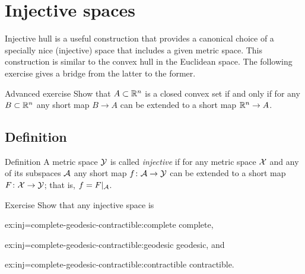\chapter{Injective spaces}\label{chap:injective}


Injective hull is a useful construction that provides a canonical choice of a specially nice (injective) space that includes a given metric space. 
This construction is similar to the convex hull in the Euclidean space.
The following exercise gives a bridge from the latter to the former.

\begin{thm}{Advanced exercise}\label{ex:conv-short}
Show that $A\subset \mathbb{R}^n$ is a closed convex set if and only if for any  $B\subset \mathbb{R}^n$ any short map $B\to A$ can be extended to a short map $\mathbb{R}^n\to A$.
\end{thm}

\section{Definition}

\begin{thm}{Definition}\label{def:injective}
A metric space $\mathcal{Y}$ is called \emph{injective} if for any metric space $\mathcal{X}$ and any of its subspaces $\mathcal{A}$
any short map $f\colon\mathcal{A}\to \mathcal{Y}$ can be extended to a short map $F\colon\mathcal{X}\to \mathcal{Y}$;
that is, $f=F|_{\mathcal{A}}$.
\end{thm}

\begin{thm}{Exercise}\label{ex:inj=complete-geodesic-contractible}
Show that any injective space is 
\begin{multicols}{3}

\begin{subthm}{ex:inj=complete-geodesic-contractible:complete}
complete,
\end{subthm}

\begin{subthm}{ex:inj=complete-geodesic-contractible:geodesic}
geodesic, and
\end{subthm}

\begin{subthm}{ex:inj=complete-geodesic-contractible:contractible}
contractible.
\end{subthm}

\end{multicols}

\end{thm}

